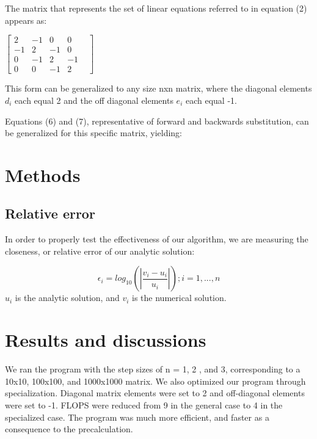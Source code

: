 \documentclass[10pt,showpacs,preprintnumbers,footinbib,amsmath,amssymb,aps,prl,twocolumn,groupedaddress,superscriptaddress,showkeys]{revtex4-1}
\begin{document}
The matrix that represents the set of linear equations referred to in equation (2) appears as:
\begin{center}
		$\begin{bmatrix}
			2 & -1 & 0 & 0 \\
			-1 & 2 & -1 & 0 & \\
			0 & -1 & 2 & -1   \\
			0 & 0 & -1 & 2 
		\end{bmatrix}$
		 
		\end{center}
This form can be generalized to any size nxn matrix, where the diagonal elements $d_{i}$ each equal 2 and the off diagonal elements $e_{i}$ each equal -1.

Equations (6) and (7), representative of forward and backwards substitution, can be generalized for this specific matrix, yielding:


\section{Methods}
	\subsection{Relative error}

In order to properly test the effectiveness of our algorithm, we are measuring the closeness, or relative error of our analytic solution:

	\begin{equation}
	\epsilon_{i} = log_{10}(|\frac{v_{i}-u_{i}}{u_{i}}|)  ; i = 1,...,n
	\label{error}
	\end{equation}
$u_{i}$ is the analytic solution, and $v_{i}$ is the numerical solution.

\section{Results and discussions}

 We ran the program with the step sizes of n = 1, 2 , and 3, corresponding to a 10x10, 100x100, and 1000x1000 matrix. We also optimized our program through specialization. Diagonal matrix elements were set to 2 and off-diagonal elements were set to -1. FLOPS were reduced from 9 in the general case to 4 in the specialized case. The program was much more efficient, and faster as a consequence to the precalculation. 
\end{document}
